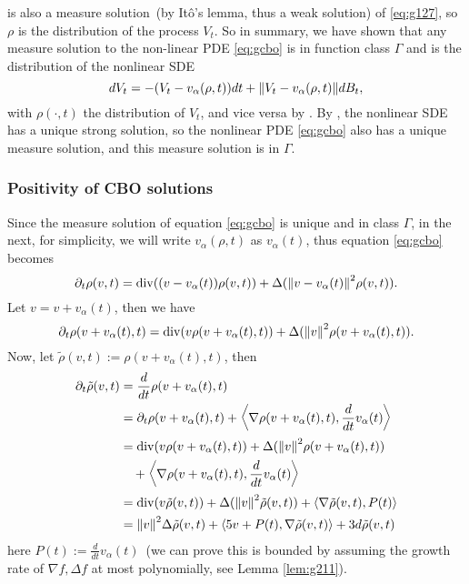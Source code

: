 \documentclass[a4paper, 11pt]{article}
\newcommand{\inner}[2]{\left< #1 , #2 \right>}
\theoremstyle{plain}
\theoremstyle{remark}
\theoremstyle{definition}
\renewcommand{\div}{\mathrm{div}}
\begin{document}
    is also a measure solution~(by It\^o's lemma, thus a weak solution) of \eqref{eq:g127}, so $\rho$ is the distribution of the process $V_t$. So in summary, we have shown that any measure solution to the non-linear PDE \eqref{eq:gcbo} is in function class $\Gamma$ and is the distribution of the nonlinear SDE \begin{equation}
		dV_t=-(V_t-v_{\alpha}(\rho,t))dt+\norm{V_t-v_\alpha(\rho,t)}dB_t,
	\end{equation} with $\rho(\cdot,t)$ the distribution of $V_t$, and vice versa by \cite[Theorem 3.2]{carrillo2018analytical}. By \cite[Theorem 3.2]{carrillo2018analytical}, the nonlinear SDE has a unique strong solution, so the nonlinear PDE \eqref{eq:gcbo} also has a unique measure solution, and this measure solution is in $\Gamma$.


\subsubsection{Positivity of CBO solutions}
Since the measure solution of equation \eqref{eq:gcbo} is unique and in class $\Gamma$, in the next, for simplicity, we will write $v_\alpha(\rho,t)$ as $v_\alpha(t)$, thus equation \eqref{eq:gcbo} becomes
\begin{equation}
\partial_t\rho(v,t)=\div((v-v_{\alpha}(t))\rho(v,t))+\Delta(\norm{v-v_{\alpha}(t)}^2\rho(v,t)).
\end{equation}
Let $v=v+v_{\alpha}(t)$, then we have
\begin{equation}\label{eq:665}
\partial_t\rho(v+v_{\alpha}(t),t)=\div(v\rho(v+v_{\alpha}(t),t))+\Delta(\norm{v}^2\rho(v+v_{\alpha}(t),t)).
\end{equation}
Now, let $\tilde{\rho}(v,t):=\rho(v+v_{\alpha}(t),t)$, then
\begin{equation}
\begin{aligned}
    \partial_t\tilde{\rho}(v,t)&=\frac{d}{dt}\rho(v+v_{\alpha}(t),t)\\
    &=\partial_t\rho(v+v_{\alpha}(t),t)+\inner{\nabla\rho(v+v_{\alpha}(t),t)}{\frac{d}{dt}v_\alpha(t)}\\
    &=\div(v\rho(v+v_{\alpha}(t),t))+\Delta(\norm{v}^2\rho(v+v_{\alpha}(t),t))\\
    &\quad+\inner{\nabla\rho(v+v_{\alpha}(t),t)}{\frac{d}{dt}v_\alpha(t)}\\
    &=\div(v\tilde{\rho}(v,t))+\Delta(\norm{v}^2\tilde{\rho}(v,t))+\inner{\nabla\tilde{\rho}(v,t)}{P(t)}\\
    &=\norm{v}^2\Delta\tilde{\rho}(v,t)+\inner{5v+P(t)}{\nabla\tilde{\rho}(v,t)}+3d\tilde{\rho}(v,t)
\end{aligned}
\end{equation}
here $P(t):=\frac{d}{dt}v_\alpha(t)$~(we can prove this is bounded by assuming the growth rate of $\nabla f,\Delta f$  at most polynomially, see Lemma \ref{lem:g211}). 
\end{document}
